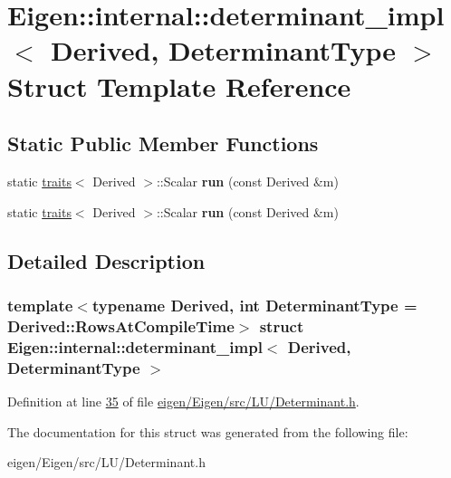 \hypertarget{struct_eigen_1_1internal_1_1determinant__impl}{}\section{Eigen\+:\+:internal\+:\+:determinant\+\_\+impl$<$ Derived, Determinant\+Type $>$ Struct Template Reference}
\label{struct_eigen_1_1internal_1_1determinant__impl}
\subsection*{Static Public Member Functions}
\begin{DoxyCompactItemize}
\item 
\mbox{\label{struct_eigen_1_1internal_1_1determinant__impl_a0d3cebab002a146163b40eef69ff18b2}} 
static \hyperlink{struct_eigen_1_1internal_1_1traits}{traits}$<$ Derived $>$\+::Scalar {\bfseries run} (const Derived \&m)
\item 
\mbox{\label{struct_eigen_1_1internal_1_1determinant__impl_a0d3cebab002a146163b40eef69ff18b2}} 
static \hyperlink{struct_eigen_1_1internal_1_1traits}{traits}$<$ Derived $>$\+::Scalar {\bfseries run} (const Derived \&m)
\end{DoxyCompactItemize}


\subsection{Detailed Description}
\subsubsection*{template$<$typename Derived, int Determinant\+Type = Derived\+::\+Rows\+At\+Compile\+Time$>$\newline
struct Eigen\+::internal\+::determinant\+\_\+impl$<$ Derived, Determinant\+Type $>$}



Definition at line \hyperlink{eigen_2_eigen_2src_2_l_u_2_determinant_8h_source_l00035}{35} of file \hyperlink{eigen_2_eigen_2src_2_l_u_2_determinant_8h_source}{eigen/\+Eigen/src/\+L\+U/\+Determinant.\+h}.



The documentation for this struct was generated from the following file\+:\begin{DoxyCompactItemize}
\item 
eigen/\+Eigen/src/\+L\+U/\+Determinant.\+h\end{DoxyCompactItemize}
